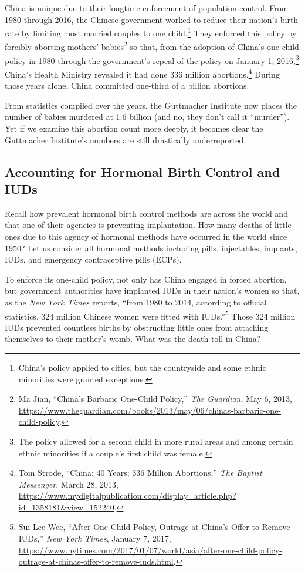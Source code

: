\documentclass[
]{book}
\begin{document}
China is unique due to their longtime enforcement of population control. From 1980 through 2016, the Chinese government worked to reduce their nation's birth rate by limiting most married couples to one child.\footnote{China's policy applied to cities, but the countryside and some ethnic minorities were granted exceptions.} They enforced this policy by forcibly aborting mothers' babies\footnote{Ma Jian, ``China's Barbaric One-Child Policy,'' \emph{The Guardian}, May 6, 2013, \url{https://www.theguardian.com/books/2013/may/06/chinas-barbaric-one-child-policy}.} so that, from the adoption of China's one-child policy in 1980 through the government's repeal of the policy on January 1, 2016,\footnote{The policy allowed for a second child in more rural areas and among certain ethnic minorities if a couple's first child was female.} China's Health Ministry revealed it had done 336 million abortions.\footnote{Tom Strode, ``China: 40 Years; 336 Million Abortions,'' \emph{The Baptist Messenger}, March 28, 2013, \url{https://www.mydigitalpublication.com/display_article.php?id=1358181\&view=152240}.} During those years alone, China committed one-third of a billion abortions.

From statistics compiled over the years, the Guttmacher Institute now places the number of babies murdered at 1.6 billion (and no, they don't call it ``murder''). Yet if we examine this abortion count more deeply, it becomes clear the Guttmacher Institute's numbers are still drastically underreported.

\hypertarget{accounting-for-hormonal-birth-control-and-iuds}{%
\subsection{Accounting for Hormonal Birth Control and IUDs}\label{accounting-for-hormonal-birth-control-and-iuds}}

Recall how prevalent hormonal birth control methods are across the world and that one of their agencies is preventing implantation. How many deaths of little ones due to this agency of hormonal methods have occurred in the world since 1950? Let us consider all hormonal methods including pills, injectables, implants, IUDs, and emergency contraceptive pills (ECPs).

To enforce its one-child policy, not only has China engaged in forced abortion, but government authorities have implanted IUDs in their nation's women so that, as the \emph{New York Times} reports, ``from 1980 to 2014, according to official statistics, 324 million Chinese women were fitted with IUDs.''\footnote{Sui-Lee Wee, ``After One-Child Policy, Outrage at China's Offer to Remove IUDs,'' \emph{New York Times}, January 7, 2017, \url{https://www.nytimes.com/2017/01/07/world/asia/after-one-child-policy-outrage-at-chinas-offer-to-remove-iuds.html}.} Those 324 million IUDs prevented countless births by obstructing little ones from attaching themselves to their mother's womb. What was the death toll in China?
\end{document}
